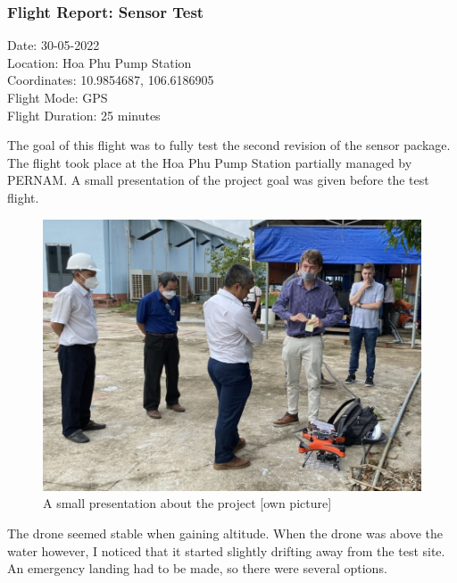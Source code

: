 \newpage
\subsubsection{Flight Report: Sensor Test}
\begin{minipage}{1\textwidth}
	\begin{flushright}
		Date: 30-05-2022\\
		Location: Hoa Phu Pump Station\\
		Coordinates: 10.9854687, 106.6186905\\
		Flight Mode: \gls{GPS}\\
		Flight Duration: 25 minutes\\\vspace{5mm}
	\end{flushright}
\end{minipage}

The goal of this flight was to fully test the second revision of the sensor package. The flight took place at the Hoa Phu Pump Station partially managed by PERNAM. A small presentation of the project goal was given before the test flight.

\begin{figure}[h]
\centering
\includegraphics[scale=1.2]{080_testing/flights/32_explanation.jpg}
\caption{A small presentation about the project [own picture]}
\end{figure}

The drone seemed stable when gaining altitude. When the drone was above the water however, I noticed that it started slightly drifting away from the test site. An emergency landing had to be made, so there were several options.



